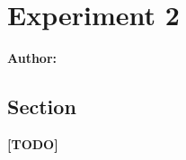 \chapter{Experiment 2}

\textbf{Author: } 

\section{Section}
\textbf{[TODO]}
\newline
\lipsum[1]

\filbreak